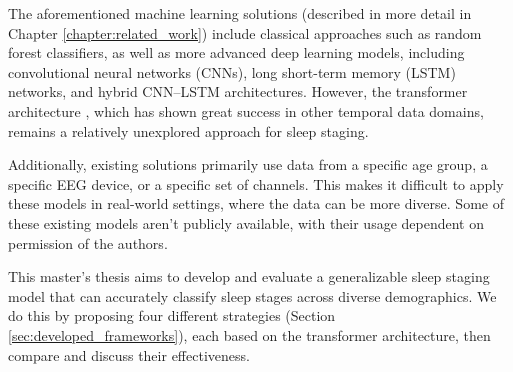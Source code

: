 The aforementioned machine learning solutions (described in more detail in Chapter \ref{chapter:related_work}) include
classical approaches such as random forest classifiers, as well as more advanced
deep learning models, including convolutional neural networks (CNNs), 
long short-term memory (LSTM) networks, and hybrid CNN–LSTM architectures.
However, the transformer architecture \cite{Vaswani2017AttentionIA}, which
has shown great success in other temporal data domains, remains a
relatively unexplored approach for sleep staging.

Additionally, existing solutions primarily use data from a specific age group,
a specific EEG device, or a specific set of channels. This makes it difficult to 
apply these models in real-world settings, where the data can be more diverse.
Some of these existing models aren't publicly available, with their usage dependent 
on permission of the authors.

This master's thesis aims to develop and evaluate a generalizable sleep staging model
that can accurately classify sleep stages across diverse demographics. We do this by proposing four different
strategies (Section \ref{sec:developed_frameworks}), each based on the transformer architecture, then compare and discuss their effectiveness.

